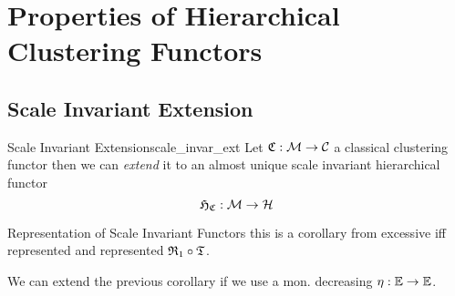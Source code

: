 \chapter{Properties of Hierarchical Clustering Functors}




\section{Scale Invariant Extension}
\todo
\begin{definition}{Scale Invariant Extension}{scale_invar_ext}
Let $\mathfrak{C}: \mathcal{M} \to \mathcal{C}$ a classical clustering functor then we can \emph{extend} it to an almost unique scale invariant hierarchical functor
$$
\mathfrak{H}_{\mathfrak{C}}: \mathcal{M} \to \mathcal{H}
$$
\end{definition}

\begin{corollary}{Representation of Scale Invariant Functors}{}
this is a corollary from excessive iff represented and represented $\mathfrak{R}_1 \circ \mathfrak{T}$.
\end{corollary}

\begin{myremark}{}{}
We can extend the previous corollary if we use a mon. decreasing $\eta: \mathbb E \to \mathbb E$.
\end{myremark}